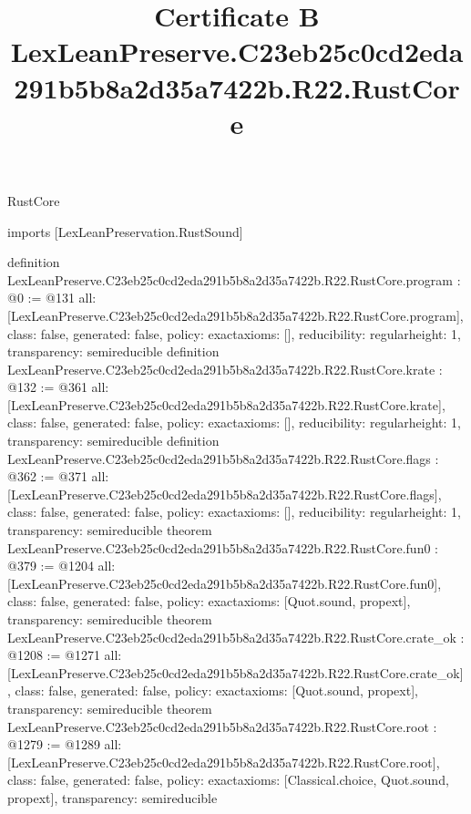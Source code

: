 \begin{lexlean}{RustCore}
\title{Certificate B LexLeanPreserve.C23eb25c0cd2eda291b5b8a2d35a7422b.R22.RustCore}
\begin{coremodule}
imports [LexLeanPreservation.RustSound]

definition LexLeanPreserve.C23eb25c0cd2eda291b5b8a2d35a7422b.R22.RustCore.program : @0 := @131 {
  all: [LexLeanPreserve.C23eb25c0cd2eda291b5b8a2d35a7422b.R22.RustCore.program],
  class: false,
  generated: false,
  policy: exact{axioms: []},
  reducibility: regular{height: 1},
  transparency: semireducible
}
definition LexLeanPreserve.C23eb25c0cd2eda291b5b8a2d35a7422b.R22.RustCore.krate : @132 := @361 {
  all: [LexLeanPreserve.C23eb25c0cd2eda291b5b8a2d35a7422b.R22.RustCore.krate],
  class: false,
  generated: false,
  policy: exact{axioms: []},
  reducibility: regular{height: 1},
  transparency: semireducible
}
definition LexLeanPreserve.C23eb25c0cd2eda291b5b8a2d35a7422b.R22.RustCore.flags : @362 := @371 {
  all: [LexLeanPreserve.C23eb25c0cd2eda291b5b8a2d35a7422b.R22.RustCore.flags],
  class: false,
  generated: false,
  policy: exact{axioms: []},
  reducibility: regular{height: 1},
  transparency: semireducible
}
theorem LexLeanPreserve.C23eb25c0cd2eda291b5b8a2d35a7422b.R22.RustCore.fun0 : @379 := @1204 {
  all: [LexLeanPreserve.C23eb25c0cd2eda291b5b8a2d35a7422b.R22.RustCore.fun0],
  class: false,
  generated: false,
  policy: exact{axioms: [Quot.sound, propext]},
  transparency: semireducible
}
theorem LexLeanPreserve.C23eb25c0cd2eda291b5b8a2d35a7422b.R22.RustCore.crate_ok : @1208 := @1271 {
  all: [LexLeanPreserve.C23eb25c0cd2eda291b5b8a2d35a7422b.R22.RustCore.crate_ok],
  class: false,
  generated: false,
  policy: exact{axioms: [Quot.sound, propext]},
  transparency: semireducible
}
theorem LexLeanPreserve.C23eb25c0cd2eda291b5b8a2d35a7422b.R22.RustCore.root : @1279 := @1289 {
  all: [LexLeanPreserve.C23eb25c0cd2eda291b5b8a2d35a7422b.R22.RustCore.root],
  class: false,
  generated: false,
  policy: exact{axioms: [Classical.choice, Quot.sound, propext]},
  transparency: semireducible
}


\end{coremodule}
\end{lexlean}

